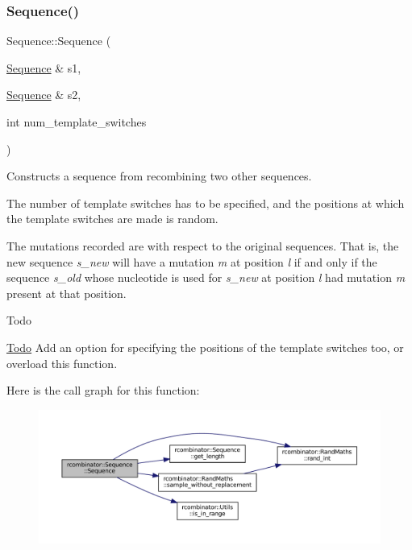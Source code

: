 \subsubsection{\texorpdfstring{Sequence()}{Sequence()}\hspace{0.1cm}{\footnotesize\ttfamily [3/3]}}
{\footnotesize\ttfamily Sequence\+::\+Sequence (\begin{DoxyParamCaption}\item[{\mbox{\hyperlink{classrcombinator_1_1Sequence}{Sequence}} \&}]{s1,  }\item[{\mbox{\hyperlink{classrcombinator_1_1Sequence}{Sequence}} \&}]{s2,  }\item[{int}]{num\+\_\+template\+\_\+switches }\end{DoxyParamCaption})}



Constructs a sequence from recombining two other sequences. 

The number of template switches has to be specified, and the positions at which the template switches are made is random.

The mutations recorded are with respect to the original sequences. That is, the new sequence {\itshape s\+\_\+new} will have a mutation {\itshape m} at position {\itshape l} if and only if the sequence {\itshape s\+\_\+old} whose nucleotide is used for {\itshape s\+\_\+new} at position {\itshape l} had mutation {\itshape m} present at that position.

\begin{DoxyRefDesc}{Todo}
\item[\mbox{\hyperlink{todo__todo000004}{Todo}}]Add an option for specifying the positions of the template switches too, or overload this function. \end{DoxyRefDesc}
Here is the call graph for this function\+:
\nopagebreak
\begin{figure}[H]
\begin{center}
\leavevmode
\includegraphics[width=350pt]{classrcombinator_1_1Sequence_a976b331689ec55d9d306281bbff5d22d_cgraph}
\end{center}
\end{figure}


